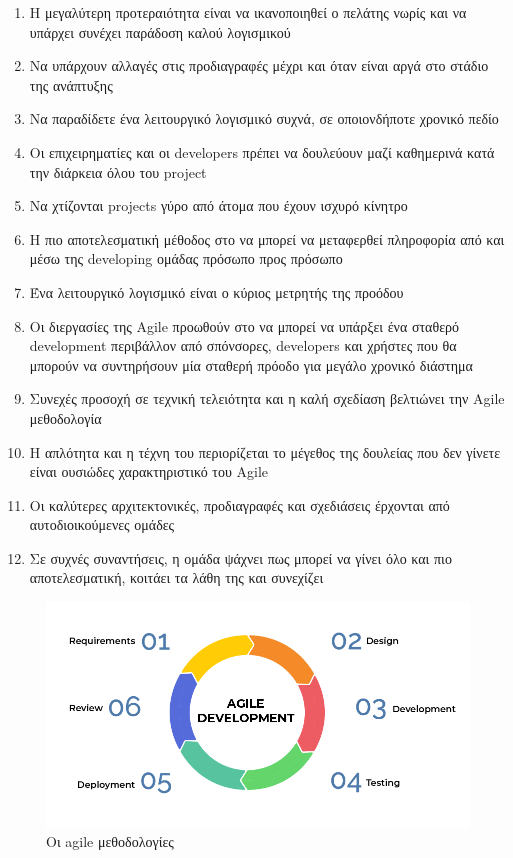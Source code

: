 \begin{enumerate}
  \item Η μεγαλύτερη προτεραιότητα είναι να ικανοποιηθεί ο πελάτης νωρίς και να υπάρχει συνέχει παράδοση καλού λογισμικού
  \item Να υπάρχουν αλλαγές στις προδιαγραφές μέχρι και όταν είναι αργά στο στάδιο της ανάπτυξης
  \item Να παραδίδετε ένα λειτουργικό λογισμικό συχνά, σε οποιονδήποτε χρονικό πεδίο
  \item Οι επιχειρηματίες και οι developers πρέπει να δουλεύουν μαζί καθημερινά κατά την διάρκεια όλου του project
  \item Να χτίζονται projects γύρο από άτομα που έχουν ισχυρό κίνητρο
  \item Η πιο αποτελεσματική μέθοδος στο να μπορεί να μεταφερθεί πληροφορία από και μέσω της developing ομάδας πρόσωπο προς πρόσωπο
  \item Ένα λειτουργικό λογισμικό είναι ο κύριος μετρητής της προόδου
  \item Οι διεργασίες της Agile προωθούν στο να μπορεί να υπάρξει ένα σταθερό development περιβάλλον από σπόνσορες, developers και χρήστες που θα μπορούν να συντηρήσουν μία σταθερή πρόοδο για μεγάλο χρονικό διάστημα
  \item Συνεχές προσοχή σε τεχνική τελειότητα και η καλή σχεδίαση βελτιώνει την Agile μεθοδολογία
  \item Η απλότητα και η τέχνη του περιορίζεται το μέγεθος της δουλείας που δεν γίνετε είναι ουσιώδες χαρακτηριστικό του Agile
  \item Οι καλύτερες αρχιτεκτονικές, προδιαγραφές και σχεδιάσεις έρχονται από αυτοδιοικούμενες ομάδες
  \item Σε συχνές συναντήσεις, η ομάδα ψάχνει πως μπορεί να γίνει όλο και πιο αποτελεσματική, κοιτάει τα λάθη της και συνεχίζει
\end{enumerate}

\begin{figure}[H]
  \centering
  \includegraphics[width=150mm]{Figures/agile.png}
  \caption[Οι agile μεθοδολογίες]{Οι agile μεθοδολογίες}
  \label{fig:agile}
\end{figure}


